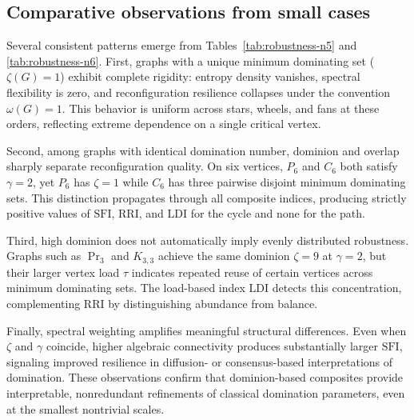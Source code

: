 \documentclass[11pt]{article}
\theoremstyle{plain}
\theoremstyle{definition}
\theoremstyle{remark}
\begin{document}
\subsection{Comparative observations from small cases}\label{app:robustness-observations}

Several consistent patterns emerge from Tables~\ref{tab:robustness-n5} and
\ref{tab:robustness-n6}.  First, graphs with a unique minimum dominating set
($\zeta(G)=1$) exhibit complete rigidity: entropy density vanishes, spectral flexibility
is zero, and reconfiguration resilience collapses under the convention $\omega(G)=1$.
This behavior is uniform across stars, wheels, and fans at these orders, reflecting
extreme dependence on a single critical vertex.

Second, among graphs with identical domination number, dominion and overlap sharply
separate reconfiguration quality.  On six vertices, $P_6$ and $C_6$ both satisfy
$\gamma=2$, yet $P_6$ has $\zeta=1$ while $C_6$ has three pairwise disjoint minimum
dominating sets.  This distinction propagates through all composite indices, producing
strictly positive values of $\mathrm{SFI}$, $\mathrm{RRI}$, and $\mathrm{LDI}$ for the
cycle and none for the path.

Third, high dominion does not automatically imply evenly distributed robustness.
Graphs such as $\Pr_3$ and $K_{3,3}$ achieve the same dominion $\zeta=9$ at $\gamma=2$,
but their larger vertex load $\tau$ indicates repeated reuse of certain vertices across
minimum dominating sets.  The load-based index $\mathrm{LDI}$ detects this concentration,
complementing $\mathrm{RRI}$ by distinguishing abundance from balance.

Finally, spectral weighting amplifies meaningful structural differences.  Even when
$\zeta$ and $\gamma$ coincide, higher algebraic connectivity produces substantially
larger $\mathrm{SFI}$, signaling improved resilience in diffusion- or consensus-based
interpretations of domination.  These observations confirm that dominion-based composites
provide interpretable, nonredundant refinements of classical domination parameters, even
at the smallest nontrivial scales.
\end{document}
